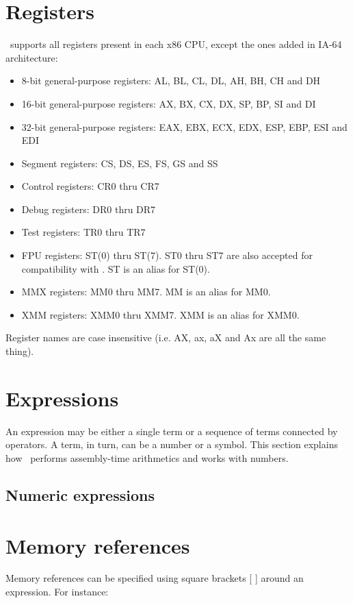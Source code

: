 \documentclass[a4paper,draft,12pt]{book}
\begin{document}
\chapter{Registers}
\popasm\ supports all registers present in each x86 CPU, except the ones
added in IA-64 architecture:

\begin{itemize}
\item{8-bit general-purpose registers:} AL, BL, CL, DL, AH, BH, CH and DH
\item{16-bit general-purpose registers:} AX, BX, CX, DX, SP, BP, SI and DI
\item{32-bit general-purpose registers:} EAX, EBX, ECX, EDX, ESP, EBP, ESI and EDI
\item{Segment registers:} CS, DS, ES, FS, GS and SS
\item{Control registers:} CR0 thru CR7
\item{Debug registers:} DR0 thru DR7
\item{Test registers:} TR0 thru TR7
\item{FPU registers:} ST(0) thru ST(7). ST0 thru ST7 are also accepted for
compatibility with \nasm. ST is an alias for ST(0).
\item{MMX registers:} MM0 thru MM7. MM is an alias for MM0.
\item{XMM registers:} XMM0 thru XMM7. XMM is an alias for XMM0.
\end{itemize}

Register names are case insensitive (i.e. AX, ax, aX and Ax are all the
same thing).

\chapter{Expressions\label{EXPR}}

An expression may be either a single term or a sequence of terms
connected by operators. A term, in turn, can be a number or a symbol.
This section explains how \popasm\ performs assembly-time arithmetics
and works with numbers.

\section{Numeric expressions\label{NUMEXPR}}

\chapter{Memory references}
Memory references can be specified using square brackets [ ] around an expression.
For instance:
\end{document}
